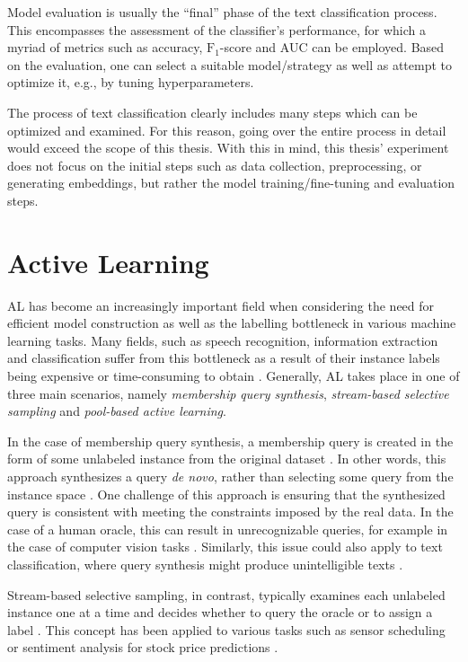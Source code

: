\documentclass[english,bachelor,ul]{webisthesis} %
\begin{document}
Model evaluation is usually the ``final'' phase of the text classification process. This encompasses the assessment of the classifier's performance, for which a myriad of metrics such as accuracy, $\text{F}_1$-score and AUC can be employed. Based on the evaluation, one can select a suitable model/strategy as well as attempt to optimize it, e.g., by tuning hyperparameters.

The process of text classification clearly includes many steps which can be optimized and examined. For this reason, going over the entire process in detail would exceed the scope of this thesis. With this in mind, this thesis' experiment does not focus on the initial steps such as data collection, preprocessing, or generating embeddings, but rather the model training/fine-tuning and evaluation steps.


\section{Active Learning}

AL has become an increasingly important field when considering the need for efficient model construction as well as the labelling bottleneck in various machine learning tasks. Many fields, such as speech recognition, information extraction and classification suffer from this bottleneck as a result of their instance labels being expensive or time-consuming to obtain \citep{settles.tr09}. Generally, AL takes place in one of three main scenarios, namely \textit{membership query synthesis}, \textit{stream-based selective sampling} and \textit{pool-based active learning}. 

In the case of membership query synthesis, a membership query is created in the form of some unlabeled instance from the original dataset \citep{DBLP:journals/ml/Angluin87, DBLP:journals/ijon/WangHYL15}. In other words, this approach synthesizes a query \textit{de novo}, rather than selecting some query from the instance space \citep{settles.tr09}. One challenge of this approach is ensuring that the synthesized query is consistent with meeting the constraints imposed by the real data. In the case of a human oracle, this can result in unrecognizable queries, for example in the case of computer vision tasks \citep{langbaum92}. Similarly, this issue could also apply to text classification, where query synthesis might produce unintelligible texts \citep{settles.tr09}.

Stream-based selective sampling, in contrast, typically examines each unlabeled instance one at a time and decides whether to query the oracle or to assign a label \citep{settles.tr09}. This concept has been applied to various tasks such as sensor scheduling \citep{DBLP:journals/tsp/Krishnamurthy02} or sentiment analysis for stock price predictions \citep{DBLP:journals/isci/SmailovicGLZ14}.
\end{document}
